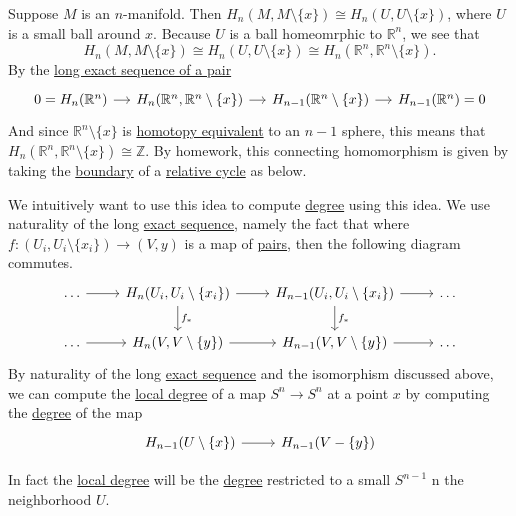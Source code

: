 \begin{answer}
	Suppose \(M\) is an \(n\)-manifold. Then \(H_n(M, M \setminus \{x\}) \cong H_n(U, U \setminus \{x\})\), where \(U\) is a small ball around \(x\).
	Because \(U\) is a ball homeomrphic to \(\mathbb{R} ^n\), we see that
	\[
		H_n(M, M \setminus \{x\}) \cong H_n(U, U \setminus \{x\}) \cong H_n(\mathbb{R} ^n, \mathbb{R} ^n \setminus \{x\}).
	\]
	By the \hyperref[thm:long-exact-sequence-of-a-pair]{long exact sequence of a pair}
	\[
		\begin{tikzcd}[column sep=small]
			{0=H_n(\mathbb{R}^n)} & {H_n(\mathbb{R}^n, \mathbb{R}^n\setminus\{x\})} & {H_{n-1}(\mathbb{R}^n\setminus\{x\})} & {H_{n-1}(\mathbb{R}^n)=0}
			\arrow[from=1-1, to=1-2]
			\arrow[from=1-2, to=1-3]
			\arrow[from=1-3, to=1-4]
		\end{tikzcd}
	\]
	And since \(\mathbb{R}^n \setminus \{x\}\) is \hyperref[def:homotopy-equivalence]{homotopy equivalent} to an \(n - 1\) sphere, this means that
	\(H_n(\mathbb{R} ^n, \mathbb{R} ^n \setminus \{x\}) \cong \mathbb{Z} \). By homework, this
	connecting homomorphism is given by taking the \hyperref[def:boundary]{boundary} of a \hyperref[def:relative-cycle]{relative cycle} as below.
	\begin{figure}[H]
		\centering
		\label{fig:connecting-homomorphism-relative-homology-rn}
	\end{figure}

	We intuitively want to use this idea to compute \hyperref[def:degree]{degree} using this idea. We use naturality of the long \hyperref[def:exact-sequence]{exact sequence},
	namely the fact that where \(f \colon (U_i, U_i \setminus \{x_i\}) \to (V, y)\) is a map of \hyperref[def:good-pair]{pairs}, then the following diagram commutes.
	\[
		\begin{tikzcd}
			\ldots & {H_n(U_i, U_i\setminus\{x_i\})} & {H_{n-1}(U_i, U_i\setminus\{x_i\})} & \ldots \\
			\ldots & {H_n(V, V\setminus\{y\})} & {H_{n-1}(V, V\setminus\{y\})} & \ldots
			\arrow[from=1-1, to=1-2]
			\arrow[from=1-2, to=1-3]
			\arrow[from=1-3, to=1-4]
			\arrow["{f_\ast}", from=1-3, to=2-3]
			\arrow[from=2-3, to=2-4]
			\arrow[from=2-2, to=2-3]
			\arrow["{f_\ast}", from=1-2, to=2-2]
			\arrow[from=2-1, to=2-2]
		\end{tikzcd}
	\]
	By naturality of the long \hyperref[def:exact-sequence]{exact sequence} and the isomorphism discussed above, we can compute the \hyperref[def:local-degree]{local degree}
	of a map \(S^n \to S^n\) at a point \(x\) by computing the \hyperref[def:degree]{degree} of the map
	\[
		\begin{tikzcd}
			{H_{n-1}(U\setminus\{x\})} & {H_{n-1}(V-\{y\})}
			\arrow[from=1-1, to=1-2]
		\end{tikzcd}
	\]

	In fact the \hyperref[def:local-degree]{local degree} will be the \hyperref[def:degree]{degree} restricted to a small \(S^{n - 1}\) n the neighborhood \(U\).
	\begin{figure}[H]
		\centering
		\label{fig:computing-local-homology-idea}
	\end{figure}
\end{answer}


